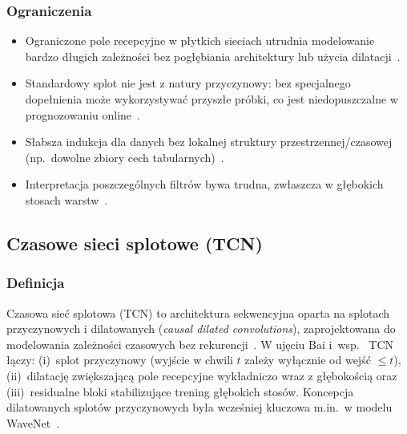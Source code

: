 \subsubsection{Ograniczenia}
\begin{itemize}
  \item Ograniczone pole recepcyjne w płytkich sieciach utrudnia modelowanie
        bardzo długich zależności bez pogłębiania architektury lub użycia
        dilatacji~\citep{yu2016multi}.
  \item Standardowy splot nie jest z natury przyczynowy: bez specjalnego
        dopełnienia może wykorzystywać przyszłe próbki, co jest niedopuszczalne
        w prognozowaniu online~\citep{bai2018empirical}.
  \item Słabsza indukcja dla danych bez lokalnej struktury przestrzennej/czasowej
        (np.\ dowolne zbiory cech tabularnych)~\citep{goodfellow2016deep}.
  \item Interpretacja poszczególnych filtrów bywa trudna, zwłaszcza w głębokich
        stosach warstw~\citep{lecun2015deep}.
\end{itemize}

\subsection{Czasowe sieci splotowe (TCN)}
\label{sec:tcn}

\subsubsection{Definicja}
Czasowa sieć splotowa (TCN) to architektura sekwencyjna oparta na splotach
przyczynowych i dilatowanych (\emph{causal dilated convolutions}), zaprojektowana
do modelowania zależności czasowych bez rekurencji~\citep{lea2017temporal,bai2018empirical}.
W ujęciu Bai i~wsp.~\cite{bai2018empirical} TCN łączy: (i)~splot przyczynowy
(wyjście w chwili $t$ zależy wyłącznie od wejść $\le t$), (ii)~dilatację zwiększającą
pole recepcyjne wykładniczo wraz z głębokością oraz (iii)~residualne bloki
stabilizujące trening głębokich stosów. Koncepcja dilatowanych splotów przyczynowych
była wcześniej kluczowa m.in.\ w modelu WaveNet~\citep{oord2016wavenet}.

